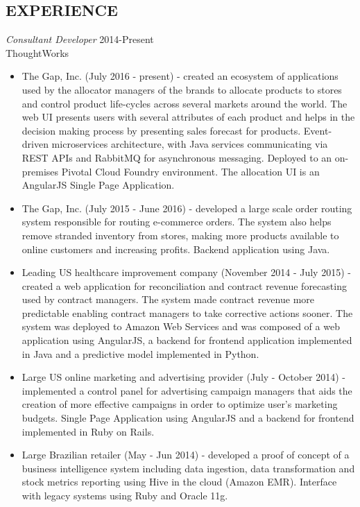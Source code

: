 \documentclass[line,margin]{res}
\begin{document}
\begin{resume}
\section{EXPERIENCE} {\sl Consultant Developer} \hfill 2014-Present\\
		ThoughtWorks
		\begin{itemize}
      \item The Gap, Inc. (July 2016 - present) - created an ecosystem of applications used by the allocator managers of the brands to allocate products 
        to stores and control product life-cycles across several markets around the world. The web UI presents users with several attributes of each product 
        and helps in the decision making process by presenting sales forecast for products. Event-driven microservices architecture, with Java services 
        communicating via REST APIs and RabbitMQ for asynchronous messaging. Deployed to an on-premises Pivotal Cloud Foundry environment. 
        The allocation UI is an AngularJS Single Page Application.
      \item The Gap, Inc. (July 2015 - June 2016) - developed a large scale order routing system responsible for routing e-commerce orders. The system
        also helps remove stranded inventory from stores, making more products available to online customers and increasing profits. Backend application using Java.
      \item Leading US healthcare improvement company (November 2014 - July 2015) - created a web application for reconciliation and contract revenue forecasting used 
        by contract managers. The system made contract revenue more predictable enabling contract managers to take corrective actions sooner. The system was deployed to 
        Amazon Web Services and was composed of a web application using AngularJS, a backend for frontend application implemented in Java and a predictive model 
        implemented in Python.
      \item Large US online marketing and advertising provider (July - October 2014) - implemented a control panel for advertising campaign managers that aids the 
        creation of more effective campaigns in order to optimize user's marketing budgets. Single Page Application using AngularJS and a backend for frontend 
        implemented in Ruby on Rails.
      \item Large Brazilian retailer (May - Jun 2014) - developed a proof of concept of a business intelligence system including data ingestion, data transformation 
        and stock metrics reporting using Hive in the cloud (Amazon EMR).  Interface with legacy systems using Ruby and Oracle 11g.

\end{itemize}
\end{resume}
\end{document}
